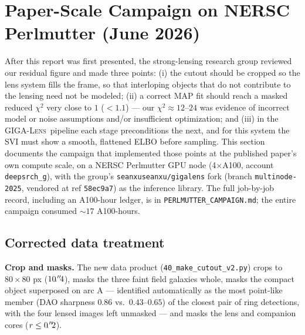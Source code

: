 \documentclass[11pt,letterpaper]{article}
\newcommand{\gigalens}{\textsc{GIGA-Lens}}
\begin{document}
\section{Paper-Scale Campaign on NERSC Perlmutter (June 2026)}
\label{sec:campaign}

After this report was first presented, the strong-lensing research group
reviewed our residual figure and made three points: (i) the cutout should
be cropped so the lens system fills the frame, so that interloping objects
that do not contribute to the lensing need not be modeled; (ii) a correct
MAP fit should reach a masked reduced $\chi^{2}$ very close to $1$
($<1.1$) --- our $\chi^{2}\approx12$--$24$ was evidence of incorrect model
or noise assumptions and/or insufficient optimization; and (iii) in the
\gigalens\ pipeline each stage preconditions the next, and for this system
the SVI must show a smooth, flattened ELBO before sampling. This section
documents the campaign that implemented those points at the published
paper's own compute scale, on a NERSC Perlmutter GPU node (4$\times$A100,
account \texttt{deepsrch\_g}), with the group's
\texttt{seanxuseanxu/gigalens} fork (branch \texttt{multinode-2025},
vendored at ref \texttt{58ec9a7}) as the inference library. The full
job-by-job record, including an A100-hour ledger, is in
\texttt{PERLMUTTER\_CAMPAIGN.md}; the entire campaign consumed
$\sim$$17$ A100-hours.

\subsection{Corrected data treatment}
\label{sec:campaign-data}

{\bf Crop and masks.} The new data product
(\texttt{40\_make\_cutout\_v2.py}) crops to $80\times80$ px
($10\mbox{$\!\!\,.{}^{\prime\prime}\!\!\,$}4$), masks the three faint field galaxies whole, masks the
compact object superposed on arc A --- identified automatically as the
most point-like member (DAO sharpness $0.86$ vs.\ $0.43$--$0.65$) of the
closest pair of ring detections, with the four lensed images left
unmasked --- and masks the lens and companion cores
($r\le0\mbox{$\!\!\,.{}^{\prime\prime}\!\!\,$}2$).
\end{document}
